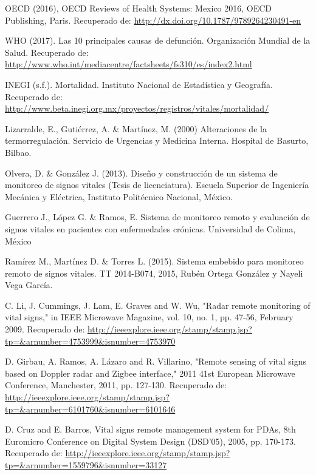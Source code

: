 \begin{thebibliography}{0}
	\setlength{\parsep}{0cm}\setlength{\itemsep}{0cm}\setlength{\topsep}{0cm}
	
	 OECD (2016), OECD Reviews of Health Systems: Mexico 2016, OECD Publishing, Paris. Recuperado de: \url{http://dx.doi.org/10.1787/9789264230491-en}

	 WHO (2017). Las 10 principales causas de defunción. Organización Mundial de la Salud. Recuperado de:  \url{http://www.who.int/mediacentre/factsheets/fs310/es/index2.html}
	
	 INEGI (s.f.). Mortalidad. Instituto Nacional de Estadística y Geografía. Recuperado de: \url{http://www.beta.inegi.org.mx/proyectos/registros/vitales/mortalidad/}
	
	 Lizarralde, E., Gutiérrez, A. \& Martínez, M. (2000) Alteraciones de la termorregulación. Servicio de Urgencias y Medicina Interna. Hospital de Basurto, Bilbao.

	 Olvera, D. \& González J. (2013). Diseño y construcción de un sistema de monitoreo de signos vitales (Tesis de licenciatura). Escuela Superior de Ingeniería Mecánica y Eléctrica, Instituto Politécnico Nacional, México.
	
	 Guerrero J., López G. \& Ramos, E. Sistema de monitoreo remoto y evaluación de signos vitales en pacientes con enfermedades crónicas. Universidad de Colima, México
	
	 Ramírez M., Martínez D. \& Torres L. (2015). Sistema embebido para monitoreo remoto de signos vitales. TT 2014-B074, 2015, Rubén Ortega González y  Nayeli Vega García.
	
	 C. Li, J. Cummings, J. Lam, E. Graves and W. Wu, "Radar remote monitoring of vital signs," in IEEE Microwave Magazine, vol. 10, no. 1, pp. 47-56, February 2009. Recuperado de: \url{http://ieeexplore.ieee.org/stamp/stamp.jsp?tp=\&arnumber=4753999\&isnumber=4753970}
	
	 D. Girbau, A. Ramos, A. Lázaro and R. Villarino, "Remote sensing of vital signs based on Doppler radar and Zigbee interface," 2011 41st European Microwave Conference, Manchester, 2011, pp. 127-130. Recuperado de: \url{http://ieeexplore.ieee.org/stamp/stamp.jsp?tp=\&arnumber=6101760\&isnumber=6101646}
	
	 D. Cruz and E. Barros, Vital signs remote management system for PDAs, 8th Euromicro Conference on Digital System Design (DSD'05), 2005, pp. 170-173. Recuperado de: \url{http://ieeexplore.ieee.org/stamp/stamp.jsp?tp=\&arnumber=1559796\&isnumber=33127}
	

\end{thebibliography}
